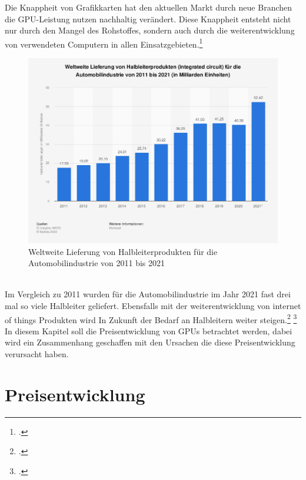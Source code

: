 \documentclass[12pt,toc=bib,toc=listof]{scrreprt}
\begin{document}
Die Knappheit von Grafikkarten hat den
aktuellen Markt durch neue Branchen die GPU-Leistung nutzen nachhaltig verändert.
Diese Knappheit entsteht nicht nur durch den Mangel des Rohstoffes, sondern auch durch die 
weiterentwicklung von verwendeten Computern in allen Einsatzgebieten.\footcite [Vgl.] []{Voas.2021}
\\
\begin{figure}[h]
  \centering
  \includegraphics[scale=0.35]{Abbildungen/Martin_Kords_1.png} %
  \caption[]{Weltweite Lieferung von Halbleiterprodukten für die Automobilindustrie von 2011 bis 2021}
\end{figure}
\\
Im Vergleich zu 2011 wurden für die Automobilindustrie im Jahr 2021 fast drei mal so viele
Halbleiter geliefert. Ebensfalls mit der weiterentwicklung von internet of things Produkten wird In
Zukunft der Bedarf an Halbleitern weiter steigen.\footcite [Vgl.] []{Bill_McClean} \footcite [Vgl.] []{Voas.2021} 
\\In diesem Kapitel soll die Preisentwicklung von GPUs betrachtet werden, dabei wird 
ein Zusammenhang geschaffen mit den Ursachen die diese Preisentwicklung 
verursacht haben.
\\ %

\section{Preisentwicklung}
\label{sec:Preisentwicklung}
\end{document}
